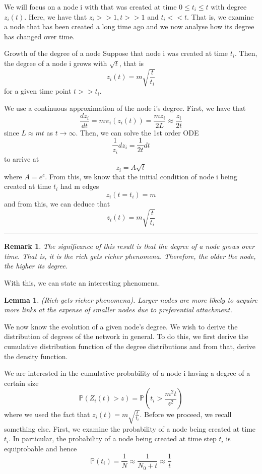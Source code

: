 \documentclass[twoside]{article}
\newcommand{\prob}{\mathbb{P}}
\newtheorem{lemma}[theorem]{Lemma}
\newtheorem{remark}[theorem]{Remark}
\newenvironment{proof}{{\bf Proof:}}{\hfill\rule{2mm}{2mm}}
\begin{document}
We will focus on a node i with that was created at time $0 \leq t_i \leq t$ with degree $z_i(t).$ Here, we have that $z_i >> 1, t >> 1$ and $t_i << t.$ That is, we examine a node that has been created a long time ago and we now analyse how its degree has changed over time.

\begin{theorem_exam}{Growth of the degree of a node}{} Suppose that node i was created at time $t_i$. Then, the degree of a node i grows with $\sqrt{t}$, that is 
$$
z_i(t) = m \sqrt{\frac{t}{t_i}}
$$
for a given time point $t >> t_i$.
\end{theorem_exam}

\begin{proof} We use a continuous approximation of the node i's degree. First, we have that 
$$
\frac{dz_i}{dt} = m \pi_i(z_i(t)) = \frac{mz_i}{2L} \approx \frac{z_i}{2t}
$$
since $L \approx mt$ as $t \rightarrow \infty.$ Then, we can solve the 1st order ODE 
$$
\frac{1}{z_i}dz_i = \frac{1}{2t}dt
$$
to arrive at 
$$
z_i = A\sqrt{t}
$$
where $A = e^c.$ From this, we know that the initial condition of node i being created at time $t_i$ had m edges 
$$
z_i(t = t_i) = m
$$
and from this, we can deduce that 
$$
z_i(t) = m \sqrt{\frac{t}{t_i}}
$$
\end{proof}

\begin{remark} The significance of this result is that the degree of a node grows over time. That is, it is the rich gets richer phenomena. Therefore, the older the node, the higher its degree.
\end{remark}


With this, we can state an interesting phenomena.

\begin{lemma}(Rich-gets-richer phenomena). Larger nodes are more likely to acquire more links at the expense of smaller nodes due to preferential attachment.
\end{lemma}


We now know the evolution of a given node's degree. We wish to derive the distribution of degrees of the network in general. To do this, we first derive the cumulative distribution function of the degree distributions and from that, derive the density function. 

We are interested in the cumulative probability of a node i having a degree of a certain size 
\begin{equation}
\prob(Z_i(t) > z) = \prob(t_i > \frac{m^2t}{z^2})
\tag{*}
\end{equation}
where we used the fact that $z_i(t) = m \sqrt{\frac{t}{t_i}}$. Before we proceed, we recall something else. First, we examine the probability of a node being created at time $t_i.$ In particular, the probability of a node being created at time step $t_i$ is equiprobable and hence 
\begin{equation}
\prob(t_i) = \frac{1}{N} \approx \frac{1}{N_0 + t} \approx \frac{1}{t}
\tag{**}
\end{equation}
\end{document}
